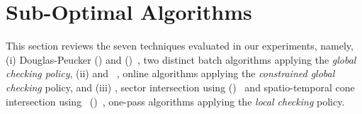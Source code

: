 \newtheorem{theorem}{Theorem}
\newtheorem{lemma}{Lemma}

\vspace{-1ex}
\section{Sub-Optimal Algorithms}
\label{sec-subopt}



This section reviews the seven techniques evaluated in our experiments, namely,
(i) Douglas-Peucker (\dpa)\cite{Douglas:Peucker,Meratnia:Spatiotemporal} and \pavlidis (\tpa)~\cite{Pavlidis:Segment}, two distinct batch algorithms applying the \emph{global checking policy},
(ii) \bqsa\cite{Liu:BQS} and \squishe~\cite{Muckell:SQUISH}, online algorithms applying the \emph{constrained global checking} policy, %
and (iii) \operb\cite{Lin:Operb}, sector intersection using \ped (\sia)~\cite{Williams:Longest,Sklansky:Cone,Dunham:Cone, Zhao:Sleeve} and spatio-temporal cone intersection using \sed~(\cia)~\cite{Lin:Cised}, one-pass algorithms applying the \emph{local checking} policy.










